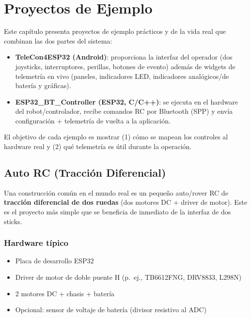 \chapter{Proyectos de Ejemplo}
\label{ch:example-projects}

Este capítulo presenta proyectos de ejemplo prácticos y de la vida real que combinan las dos partes del sistema:

\begin{itemize}
    \item \textbf{TeleCon4ESP32 (Android)}: proporciona la interfaz del operador (dos joysticks, interruptores, perillas, botones de evento) además de widgets de telemetría en vivo (paneles, indicadores LED, indicadores analógicos/de batería y gráficas).
    \item \textbf{ESP32\_BT\_Controller (ESP32, C/C++)}: se ejecuta en el hardware del robot/controlador, recibe comandos RC por Bluetooth (SPP) y envía configuración + telemetría de vuelta a la aplicación.
\end{itemize}

El objetivo de cada ejemplo es mostrar (1) cómo se mapean los controles al hardware real y (2) qué telemetría es útil durante la operación.

\section{Auto RC (Tracción Diferencial)}
\label{sec:example-rc-car}

Una construcción común en el mundo real es un pequeño auto/rover RC de \textbf{tracción diferencial de dos ruedas} (dos motores DC + driver de motor). Este es el proyecto más simple que se beneficia de inmediato de la interfaz de dos sticks.

\subsection*{Hardware típico}
\begin{itemize}
    \item Placa de desarrollo ESP32
    \item Driver de motor de doble puente H (p.\ ej., TB6612FNG, DRV8833, L298N)
    \item 2 motores DC + chasis + batería
    \item Opcional: sensor de voltaje de batería (divisor resistivo al ADC)
\end{itemize}

